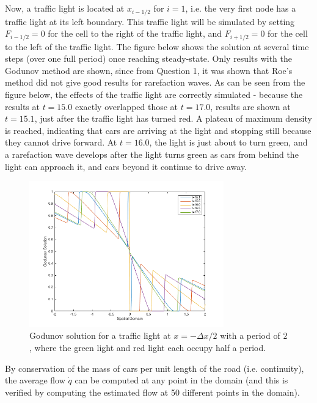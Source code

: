 \documentclass[10pt]{article}
\begin{document}
\section{}
Now, a traffic light is located at \(x_{i-1/2}\) for \(i=1\), i.e. the very first node has a traffic light at its left boundary. This traffic light will be simulated by setting \(F_{i-1/2}=0\) for the cell to the right of the traffic light, and \(F_{i+1/2}=0\) for the cell to the left of the traffic light. The figure below shows the solution at several time steps (over one full period) once reaching steady-state. Only results with the Godunov method are shown, since from Question 1, it was shown that Roe's method did not give good results for rarefaction waves. As can be seen from the figure below, the effects of the traffic light are correctly simulated - because the results at \(t=15.0\) exactly overlapped those at \(t=17.0\), results are shown at \(t=15.1\), just after the traffic light has turned red. A plateau of maximum density is reached, indicating that cars are arriving at the light and stopping still because they cannot drive forward. At \(t=16.0\), the light is just about to turn green, and a rarefaction wave develops after the light turns green as cars from behind the light can approach it, and cars beyond it continue to drive away. 

\begin{figure}[H]
\centering
\includegraphics[width=0.75\textwidth]{figures/godunov2.png}
\caption{Godunov solution for a traffic light at \(x=-\Delta x/2\) with a period of \(2\), where the green light and red light each occupy half a period.}
\end{figure}

By conservation of the mass of cars per unit length of the road (i.e. continuity), the average flow \(\dot{q}\) can be computed at any point in the domain (and this is verified by computing the estimated flow at 50 different points in the domain). 
\end{document}

